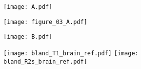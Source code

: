 \documentclass[preview]{standalone}
\begin{document}
\begin{figure}
	\centering
	\begin{minipage}{.03\textwidth}
		\texttt{[image: A.pdf]}\vspace*{6cm}
	\end{minipage}
	\hfill %
	\begin{minipage}{.96\textwidth}
		\texttt{[image: figure\_03\_A.pdf]}
	\end{minipage}%

	\vspace*{0.2cm}

	\begin{minipage}{.03\textwidth}
		\texttt{[image: B.pdf]}\vspace*{2.7cm}
	\end{minipage}
	\hfill %
	\begin{minipage}{.96\textwidth}
		\hspace{1.5cm}
		\texttt{[image: bland\_T1\_brain\_ref.pdf]}\hspace{0.8cm}
		\texttt{[image: bland\_R2s\_brain\_ref.pdf]}\hfill
	\end{minipage}%

\end{figure}
\end{document}
